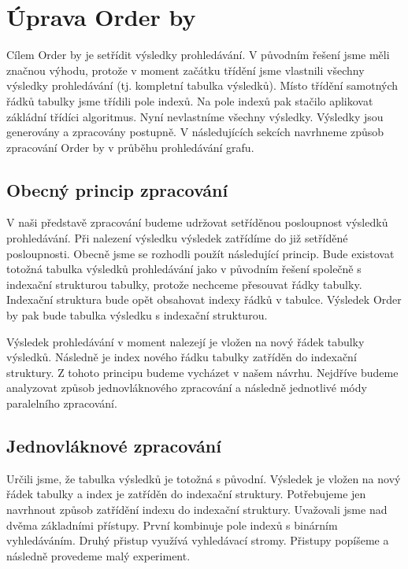 \section{Úprava Order by} \label{anal.improvement.orderby}

Cílem Order by je setřídit výsledky prohledávání.
V původním řešení jsme měli značnou výhodu, protože v moment začátku třídění jsme vlastnili všechny výsledky prohledávání (tj. kompletní tabulka výsledků).
Místo třídění samotných řádků tabulky jsme třídili pole indexů.
Na pole indexů pak stačilo aplikovat zákládní třídíci algoritmus.
Nyní nevlastníme všechny výsledky.
Výsledky jsou generovány a zpracovány postupně.
V následujících sekcích navrhneme způsob zpracování Order by v průběhu prohledávání grafu.

\subsection{Obecný princip zpracování}

V naši představě zpracování budeme udržovat setříděnou posloupnost výsledků prohledávání.
Při nalezení výsledku výsledek zatřídíme do již setříděné posloupnosti.
Obecně jsme se rozhodli použít následující princip.
Bude existovat totožná tabulka výsledků prohledávání jako v původním řešení společně s indexační strukturou tabulky, protože nechceme přesouvat řádky tabulky.
Indexační struktura bude opět obsahovat indexy řádků v tabulce.
Výsledek Order by pak bude tabulka výsledku s indexační strukturou.

Výsledek prohledávání v moment nalezejí je vložen na nový řádek tabulky výsledků.
Následně je index nového řádku tabulky zatříděn do indexační struktury.
Z tohoto principu budeme vycházet v našem návrhu.
Nejdříve budeme analyzovat způsob jednovláknového zpracování a následně jednotlivé módy paralelního zpracování.

\subsection{Jednovláknové zpracování} \label{anal.ordeby.single}

Určili jsme, že tabulka výsledků je totožná s původní.
Výsledek je vložen na nový řádek tabulky a index je zatříděn do indexační struktury.
Potřebujeme jen navrhnout způsob zatřídění indexu do indexační struktury.
Uvažovali jsme nad dvěma základními přístupy.
První kombinuje pole indexů s binárním vyhledáváním.
Druhý přistup využívá vyhledávací stromy.
Přistupy popíšeme a následně provedeme malý experiment.


